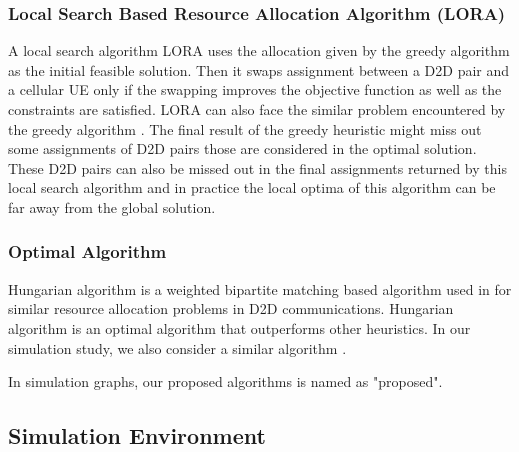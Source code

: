 \documentclass[times]{dacauth}
\begin{document}
\subsubsection{Local Search Based Resource Allocation Algorithm (LORA)} 
\noindent
A local search algorithm LORA \cite {lora} uses the allocation given by the greedy algorithm \cite{zulhasnine} as the initial feasible solution. Then it swaps assignment between a D2D pair and a cellular UE only if the swapping improves the objective function as well as the constraints  are satisfied. LORA can also face the similar problem encountered by the greedy algorithm \cite{zulhasnine}. The final result of the greedy heuristic might miss out some assignments of D2D pairs those are considered in the optimal solution. These D2D pairs can also be missed out in the final assignments returned by this local search algorithm and in practice the local optima of this algorithm can be far away from the global solution.


\subsubsection{Optimal Algorithm}

\noindent
Hungarian algorithm \cite{hungarian} is a weighted bipartite matching based algorithm used in \cite {zhang, feng, ccnc} for similar resource allocation problems in D2D communications. Hungarian algorithm is an optimal algorithm that outperforms other heuristics. In our simulation study, we also consider a similar algorithm \cite{hungarian}.
\par
\noindent
In simulation graphs, our proposed algorithms is named as "proposed".


\subsection{Simulation Environment}
\end{document}
